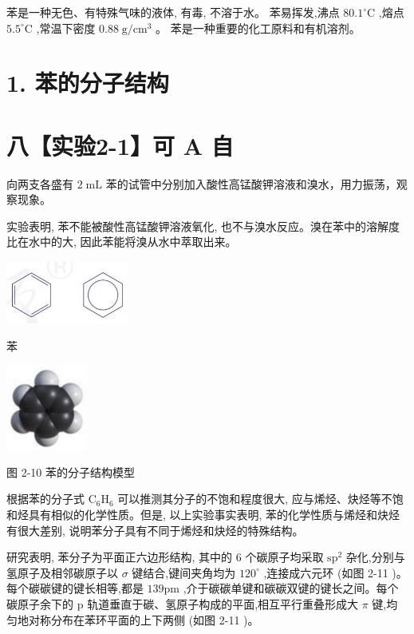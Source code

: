 \documentclass[10pt]{article}
\begin{document}
苯是一种无色、有特殊气味的液体, 有毒, 不溶于水。 苯易挥发,沸点 \({80.1}^{ \circ }\mathrm{C}\) ,熔点 \({5.5}^{ \circ }\mathrm{C}\) ,常温下密度 \({0.88}\mathrm{\;g}/{\mathrm{{cm}}}^{3}\) 。 苯是一种重要的化工原料和有机溶剂。

\section*{1. 苯的分子结构}

\section*{八【实验2-1】可 A 自}

向两支各盛有 \(2\mathrm{\;{mL}}\) 苯的试管中分别加入酸性高锰酸钾溶液和溴水，用力振荡，观察现象。

实验表明, 苯不能被酸性高锰酸钾溶液氧化, 也不与溴水反应。溴在苯中的溶解度比在水中的大, 因此苯能将溴从水中萃取出来。

\begin{center}
\includegraphics[max width=0.3\textwidth]{images/0190efc5-b58a-7c43-bfb0-e0a030df9cfd_48_787300.jpg}
\end{center}

苯

\begin{center}
\includegraphics[max width=0.2\textwidth]{images/0190efc5-b58a-7c43-bfb0-e0a030df9cfd_48_704783.jpg}
\end{center}

图 2-10 苯的分子结构模型

根据苯的分子式 \({\mathrm{C}}_{6}{\mathrm{H}}_{6}\) 可以推测其分子的不饱和程度很大, 应与烯烃、炔烃等不饱和烃具有相似的化学性质。但是, 以上实验事实表明, 苯的化学性质与烯烃和炔烃有很大差别, 说明苯分子具有不同于烯烃和炔烃的特殊结构。

研究表明, 苯分子为平面正六边形结构, 其中的 6 个碳原子均采取 \({\mathrm{{sp}}}^{2}\) 杂化,分别与氢原子及相邻碳原子以 \(\sigma\) 键结合,键间夹角均为 \({120}^{ \circ }\) ,连接成六元环 (如图 2-11 )。每个碳碳键的键长相等,都是 \({139}\mathrm{{pm}}\) ,介于碳碳单键和碳碳双键的键长之间。每个碳原子余下的 \(\mathrm{p}\) 轨道垂直于碳、氢原子构成的平面,相互平行重叠形成大 \(\pi\) 键,均匀地对称分布在苯环平面的上下两侧 (如图 2-11 )。
\end{document}

